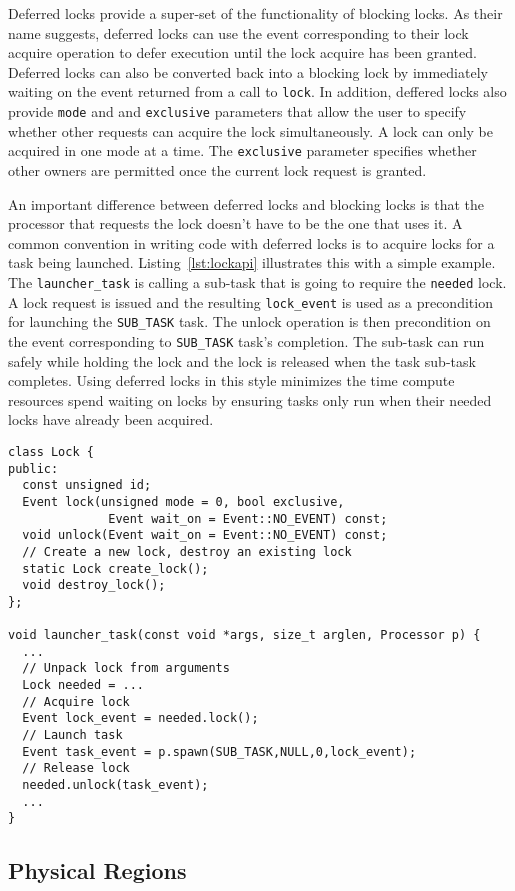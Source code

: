 Deferred locks provide a super-set of the functionality of blocking locks.  As their
name suggests, deferred locks can use the event corresponding to their lock acquire
operation to defer execution until the lock acquire has been granted.  Deferred
locks can also be converted back into a blocking lock by immediately waiting on the event
returned from a call to {\tt lock}.  In addition, deffered locks also provide {\tt mode} and
and {\tt exclusive} parameters that allow the user to specify whether other requests can acquire
the lock simultaneously.  A lock can only be acquired in one mode at a time.  The
{\tt exclusive} parameter specifies whether other owners are permitted once the
current lock request is granted.

An important difference between deferred locks and blocking locks is that the processor
that requests the lock doesn't have to be the one that uses it.  A common
convention in writing code with deferred locks is to acquire locks for a task being
launched.  Listing~\ref{lst:lockapi} illustrates this with a simple example.  The
{\tt launcher\_task} is calling a sub-task that is going to require the {\tt needed}
lock.  A lock request is issued and the resulting {\tt lock\_event} is used as
a precondition for launching the {\tt SUB\_TASK} task.  The unlock operation is then
precondition on the event corresponding to {\tt SUB\_TASK} task's completion.  The
sub-task can run safely while holding the lock and the lock is released when the task
sub-task completes.  Using deferred locks in this style minimizes the time
compute resources spend waiting on locks by ensuring tasks only run when their needed
locks have already been acquired.

\begin{lstlisting}[float={t},label={lst:lockapi},caption={Deferred Lock Interface and Example.}]
class Lock {
public:
  const unsigned id;
  Event lock(unsigned mode = 0, bool exclusive, 
              Event wait_on = Event::NO_EVENT) const;
  void unlock(Event wait_on = Event::NO_EVENT) const;
  // Create a new lock, destroy an existing lock
  static Lock create_lock();
  void destroy_lock();
};

void launcher_task(const void *args, size_t arglen, Processor p) {
  ...
  // Unpack lock from arguments
  Lock needed = ...
  // Acquire lock
  Event lock_event = needed.lock();
  // Launch task
  Event task_event = p.spawn(SUB_TASK,NULL,0,lock_event);
  // Release lock
  needed.unlock(task_event);
  ...
}
\end{lstlisting}

\subsection{Physical Regions}
\label{subsec:phyreg}

